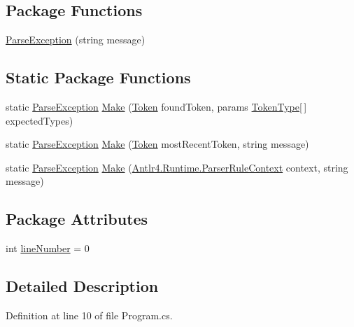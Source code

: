 \subsection*{Package Functions}
\begin{DoxyCompactItemize}
\item 
\hyperlink{a00137_aa3c4f5c8b0ae86097bbc46044df9f317}{Parse\-Exception} (string message)
\end{DoxyCompactItemize}
\subsection*{Static Package Functions}
\begin{DoxyCompactItemize}
\item 
static \hyperlink{a00137}{Parse\-Exception} \hyperlink{a00137_a511a51bb42dc5bb107eb68f7e5cf5ff1}{Make} (\hyperlink{a00163}{Token} found\-Token, params \hyperlink{a00041_a301aa7c866593a5b625a8fc158bbeace}{Token\-Type}\mbox{[}$\,$\mbox{]} expected\-Types)
\item 
static \hyperlink{a00137}{Parse\-Exception} \hyperlink{a00137_a173f3cabc4741d9d9e016310e90c1c9f}{Make} (\hyperlink{a00163}{Token} most\-Recent\-Token, string message)
\item 
static \hyperlink{a00137}{Parse\-Exception} \hyperlink{a00137_a0265905b09fbd675d40c452d9fc61207}{Make} (\hyperlink{a00302_a7e45f8222713cb764832fd3c69d0268f}{Antlr4.\-Runtime.\-Parser\-Rule\-Context} context, string message)
\end{DoxyCompactItemize}
\subsection*{Package Attributes}
\begin{DoxyCompactItemize}
\item 
int \hyperlink{a00137_ab335169367e64fd6d89d58b3ac573751}{line\-Number} = 0
\end{DoxyCompactItemize}


\subsection{Detailed Description}


Definition at line 10 of file Program.\-cs.



